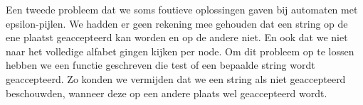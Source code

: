 \documentclass[a4paper, 11pt]{article}
\begin{document}
		Een tweede probleem dat we soms foutieve oplossingen gaven bij automaten met epsilon-pijlen. We hadden er geen rekening mee gehouden dat een string op de ene plaatst geaccepteerd kan worden en op de andere niet. En ook dat we niet naar het volledige alfabet gingen kijken per node. Om dit probleem op te lossen hebben we een functie geschreven die test of een bepaalde string wordt geaccepteerd. Zo konden we vermijden dat we een string als niet geaccepteerd beschouwden, wanneer deze op een andere plaats wel geaccepteerd wordt.
	
	
	
	
	
	
	
	
	
	
	
\end{document}
